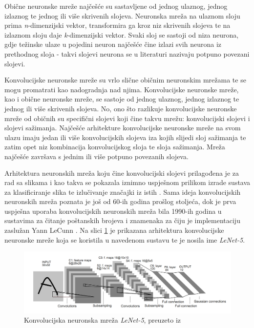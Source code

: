 Obične neuronske mreže najčešće su sastavljene od jednog ulaznog, jednog izlaznog te jednog ili više skrivenih slojeva. Neuronska mreža na ulaznom sloju prima \emph{n}-dimenzijski vektor, transformira ga kroz niz skrivenih slojeva te na izlaznom sloju daje \emph{k}-dimenzijski vektor. Svaki sloj se sastoji od niza neurona, gdje težinske ulaze u pojedini neuron najčešće čine izlazi svih neurona iz prethodnog sloja - takvi slojevi neurona se u literaturi nazivaju potpuno povezani slojevi. 

Konvolucijske neuronske mreže  su vrlo slične običnim neuronskim mrežama te se mogu promatrati kao nadogradnja nad njima. Konvolucijske neuronske mreže, kao i obične neuronske mreže, se sastoje od jednog ulaznog, jednog izlaznog te jednog ili više skrivenih slojeva. No, ono što razlikuje konvolucijske neuronske mreže od običnih su specifični slojevi koji čine takvu mrežu: konvolucijski slojevi i slojevi sažimanja. Najčešće arhitekture konvolucijske neuronske mreže na svom ulazu imaju jedan ili više konvolucijskih slojeva iza kojih slijedi sloj sažimanja te zatim opet niz kombinacija konvolucijskog sloja te sloja sažimanja. Mreža najčešće završava s jednim ili više potpuno povezanih slojeva.

Arhitektura neuronskih mreža koju čine konvolucijski slojevi prilagođena je za rad sa slikama i kao takva se pokazala iznimno uspješnom prilikom izrade sustava za klasificiranje slika te izlučivanje značajki iz istih \citep{Lecun1998}. Sama ideja konvolucijskih neuronskih mreža poznata je još od 60-ih godina prošlog stoljeća, dok je prva uspješna uporaba konvolucijskih neuronskih mreža bila 1990-ih godina u sustavima za čitanje poštanskih brojeva i znamenaka za čiju je implementaciju zaslužan Yann LeCunn \citep{StanfordCS}. Na slici \ref{fig:lenet5} je prikazana arhitektura konvolucijske neuronske mreže koja se koristila u navedenom sustavu te je nosila ime \emph{LeNet-5}.

\begin{figure}[htb]
    \centering
    \includegraphics[width=14.5cm]{images/lenet-5.png}
    \caption{Konvolucijska neuronska mreža \emph{LeNet-5}, preuzeto iz \citep{Lecun1998}}
    \label{fig:lenet5}
\end{figure}

